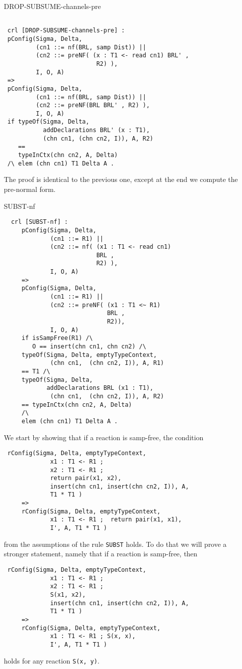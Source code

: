 \documentclass{article}
\begin{document}
\begin{itemize}
\item[DROP-SUBSUME-channels-pre]
 \begin{lstlisting}

 crl [DROP-SUBSUME-channels-pre] :
 pConfig(Sigma, Delta,
         (cn1 ::= nf(BRL, samp Dist)) || 
         (cn2 ::= preNF( (x : T1 <- read cn1) BRL' , 
                          R2) ),
         I, O, A) 
 =>           
 pConfig(Sigma, Delta,
         (cn1 ::= nf(BRL, samp Dist)) || 
         (cn2 ::= preNF(BRL BRL' , R2) ),
         I, O, A) 
 if typeOf(Sigma, Delta,  
           addDeclarations BRL' (x : T1), 
           (chn cn1, (chn cn2, I)), A, R2) 
    == 
    typeInCtx(chn cn2, A, Delta)
 /\ elem (chn cn1) T1 Delta A . 
       \end{lstlisting}

 The proof is identical to the previous one, except at the end we
 compute the pre-normal form.

\item[SUBST-nf]
 \begin{lstlisting}           
  crl [SUBST-nf] : 
     pConfig(Sigma, Delta,
             (cn1 ::= R1) || 
             (cn2 ::= nf( (x1 : T1 <- read cn1) 
                          BRL , 
                          R2) ),
             I, O, A)  
     => 
     pConfig(Sigma, Delta,
             (cn1 ::= R1) || 
             (cn2 ::= preNF( (x1 : T1 <~ R1)
                             BRL , 
                             R2)),
             I, O, A) 
     if isSampFree(R1) /\
        O == insert(chn cn1, chn cn2) /\ 
     typeOf(Sigma, Delta, emptyTypeContext, 
             (chn cn1,  (chn cn2, I)), A, R1) 
     == T1 /\
     typeOf(Sigma, Delta, 
            addDeclarations BRL (x1 : T1), 
             (chn cn1,  (chn cn2, I)), A, R2) 
     == typeInCtx(chn cn2, A, Delta)
     /\
     elem (chn cn1) T1 Delta A . 
       \end{lstlisting}
       
 We start by showing that if a reaction is samp-free, the 
 condition 
 \begin{lstlisting}
 rConfig(Sigma, Delta, emptyTypeContext,
             x1 : T1 <- R1 ; 
             x2 : T1 <- R1 ; 
             return pair(x1, x2),
             insert(chn cn1, insert(chn cn2, I)), A, 
             T1 * T1 )
     => 
     rConfig(Sigma, Delta, emptyTypeContext,
             x1 : T1 <- R1 ;  return pair(x1, x1),
             I', A, T1 * T1 )
 \end{lstlisting}
 \noindent from the assumptions of the rule \verb+SUBST+
 holds.
 To do that we will prove a stronger statement, namely that 
 if a reaction is samp-free, then 
 \begin{lstlisting}
 rConfig(Sigma, Delta, emptyTypeContext,
             x1 : T1 <- R1 ; 
             x2 : T1 <- R1 ; 
             S(x1, x2),
             insert(chn cn1, insert(chn cn2, I)), A, 
             T1 * T1 )
     => 
     rConfig(Sigma, Delta, emptyTypeContext,
             x1 : T1 <- R1 ; S(x, x),
             I', A, T1 * T1 )
 \end{lstlisting}
 \noindent
 holds for any reaction \verb+S(x, y)+.
 

\end{itemize}
\end{document}
